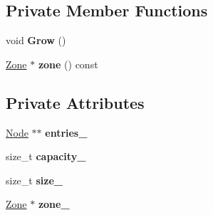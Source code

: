 \subsection*{Private Member Functions}
\begin{DoxyCompactItemize}
\item 
void {\bfseries Grow} ()\hypertarget{classv8_1_1internal_1_1compiler_1_1_value_numbering_reducer_a326c22e597d0f404b75f0ebd41d7b2f0}{}\label{classv8_1_1internal_1_1compiler_1_1_value_numbering_reducer_a326c22e597d0f404b75f0ebd41d7b2f0}

\item 
\hyperlink{classv8_1_1internal_1_1_zone}{Zone} $\ast$ {\bfseries zone} () const \hypertarget{classv8_1_1internal_1_1compiler_1_1_value_numbering_reducer_a881a4f861ae17af006793714eef50e31}{}\label{classv8_1_1internal_1_1compiler_1_1_value_numbering_reducer_a881a4f861ae17af006793714eef50e31}

\end{DoxyCompactItemize}
\subsection*{Private Attributes}
\begin{DoxyCompactItemize}
\item 
\hyperlink{classv8_1_1internal_1_1compiler_1_1_node}{Node} $\ast$$\ast$ {\bfseries entries\+\_\+}\hypertarget{classv8_1_1internal_1_1compiler_1_1_value_numbering_reducer_a4eb98539c46cf5204231f5fea85bcd9c}{}\label{classv8_1_1internal_1_1compiler_1_1_value_numbering_reducer_a4eb98539c46cf5204231f5fea85bcd9c}

\item 
size\+\_\+t {\bfseries capacity\+\_\+}\hypertarget{classv8_1_1internal_1_1compiler_1_1_value_numbering_reducer_a1dec4b3615b9e6f74b77f42d08cafcbd}{}\label{classv8_1_1internal_1_1compiler_1_1_value_numbering_reducer_a1dec4b3615b9e6f74b77f42d08cafcbd}

\item 
size\+\_\+t {\bfseries size\+\_\+}\hypertarget{classv8_1_1internal_1_1compiler_1_1_value_numbering_reducer_acf2e54ca0f3e1e33f6e4077705625cfd}{}\label{classv8_1_1internal_1_1compiler_1_1_value_numbering_reducer_acf2e54ca0f3e1e33f6e4077705625cfd}

\item 
\hyperlink{classv8_1_1internal_1_1_zone}{Zone} $\ast$ {\bfseries zone\+\_\+}\hypertarget{classv8_1_1internal_1_1compiler_1_1_value_numbering_reducer_afdf4449bde4d904d05bc9b25caf31f08}{}\label{classv8_1_1internal_1_1compiler_1_1_value_numbering_reducer_afdf4449bde4d904d05bc9b25caf31f08}

\end{DoxyCompactItemize}
